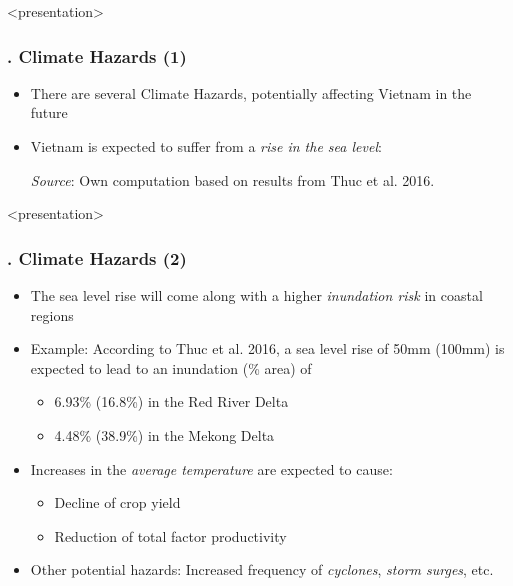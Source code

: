 \documentclass[11pt,aspectratio=169]{beamer}
\begin{document}
\begin{frame}<presentation>
	\frametitle{{\thesection.\thesubsection} Climate Hazards (1)}
	\begin{itemize}
		\item There are several Climate Hazards, potentially affecting Vietnam in the future
		\item Vietnam is expected to suffer from a \textit{rise in the sea level}:
		\begin{figure}
		\end{figure}
		\hspace{2cm} \footnotesize{\textit{Source}: Own computation based on results from Thuc et al. 2016.}
	\end{itemize}
\end{frame}
\begin{frame}<presentation>
	\frametitle{{\thesection.\thesubsection} Climate Hazards (2)}
	\begin{itemize}
		\item The sea level rise will come along with a higher \textit{inundation risk} in coastal regions
		\item Example: According to Thuc et al. 2016, a sea level rise of 50mm (100mm) is expected to lead to an inundation (\% area) of
		\begin{itemize}
			\item 6.93\% (16.8\%) in the Red River Delta
			\item 4.48\% (38.9\%) in the Mekong Delta
		\end{itemize}
	\item Increases in the \textit{average temperature} are expected to cause:
		\begin{itemize}
			\item Decline of crop yield
			\item Reduction of total factor productivity
		\end{itemize}
	\item Other potential hazards: Increased frequency of \textit{cyclones}, \textit{storm surges}, etc.
	\end{itemize}
\end{frame}
\end{document}
